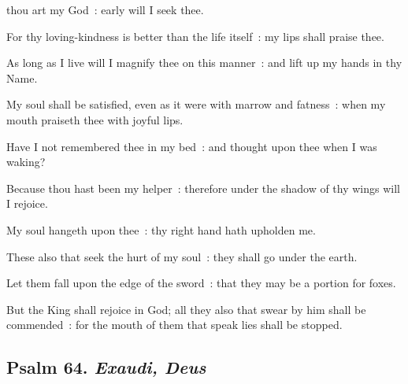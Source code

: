  thou art my God~: early will I seek thee.\par
{}
For thy loving-kindness is better than the life itself~: my lips shall praise thee.\par
{}As long as I live will I magnify thee on this manner~: and lift up my hands in thy Name.\par
{}My soul shall be satisfied, even as it were with marrow and fatness~: when my mouth praiseth thee with joyful lips.\par
{}Have I not remembered thee in my bed~: and thought upon thee when I was waking?\par
{}Because thou hast been my helper~: therefore under the shadow of thy wings will I rejoice.\par
{}My soul hangeth upon thee~: thy right hand hath upholden me.\par
{}These also that seek the hurt of my soul~: they shall go under the earth.\par
{}Let them fall upon the edge of the sword~: that they may be a portion for foxes.\par
{}But the King shall rejoice in God; all they also that swear by him shall be commended~: for the mouth of them that speak lies shall be stopped.\par

\subsection{Psalm 64. \textit{Exaudi, Deus}}

